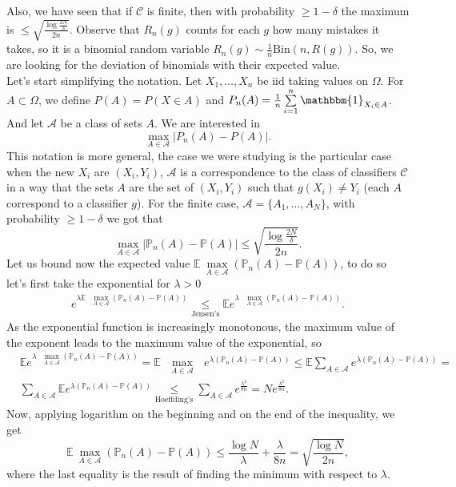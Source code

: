 \documentclass[11pt, english]{article}
\begin{document}
Also, we have seen that if $\mathcal{C}$ is finite, then with probability $\geq 1-\delta$ the maximum is $\leq \sqrt{\frac{\log\frac{2N}{\delta}}{2n}}$. Observe that $R_n(g)$ counts for each $g$ how many mistakes it takes, so it is a binomial random variable $R_n(g)\sim \frac{1}{n}\text{Bin}(n,R(g))$. So, we are looking for the deviation of binomials with their expected value.\\ 

Let's start simplifying the notation. Let $X_1,\dots,X_n$ be iid taking values on $\Omega$. For $A\subset \Omega$, we define $P(A)=P(X\in A)$ and $P_n(A)=\frac{1}{n}\sum\limits_{i=1}^n\mathbbm{1}_{X_i\in A}$. And let $\mathcal{A}$ be a class of sets $A$. We are interested in 
\begin{equation}
	\underset{A\in\mathcal{A}}{\max}|P_n(A)-P(A)|.
\end{equation}
This notation is more general, the case we were studying is the particular case when the new $X_i$ are $(X_i,Y_i)$, $\mathcal{A}$ is a correspondence to the class of classifiers $\mathcal{C}$ in a way that the sets $A$ are the set of $(X_i,Y_i)$ such that $g(X_i)\neq Y_i$ (each $A$ correspond to a classifier $g$). For the finite case, $\mathcal{A}=\{A_1,\dots,A_N\}$, with probability $\geq 1-\delta$ we got that  
\begin{equation}
	\underset{A\in\mathcal{A}}{\max}|\mathbb{P}_n(A)-\mathbb{P}(A)|\leq\sqrt{\frac{\log\frac{2N}{\delta}}{2n}}.
\end{equation}
Let us bound now the expected value $\mathbb{E}\ \underset{A\in\mathcal{A}}{\max}(\mathbb{P}_n(A)-\mathbb{P}(A))$, to do so let's first take the exponential for $\lambda>0$
\begin{align}
	e^{\lambda\mathbb{E}\text{ }\underset{A\in\mathcal{A}}{\max}(\mathbb{P}_n(A)-\mathbb{P}(A))}\underset{\text{Jensen's}}{\leq}\mathbb{E}e^{\lambda\text{ }\underset{A\in\mathcal{A}}{\max}(\mathbb{P}_n(A)-\mathbb{P}(A))}.
\end{align}
As the exponential function is increasingly monotonous, the maximum value of the exponent leads to the maximum value of the exponential, so 
\begin{align}
	&\mathbb{E}e^{\lambda\text{ }\underset{A\in\mathcal{A}}{\max}(\mathbb{P}_n(A)-\mathbb{P}(A))}=\mathbb{E}\text{ }\underset{A\in\mathcal{A}}{\max}\text{ }e^{\lambda(\mathbb{P}_n(A)-\mathbb{P}(A))}\leq\mathbb{E}\sum\limits_{A\in\mathcal{A}}e^{\lambda(\mathbb{P}_n(A)-\mathbb{P}(A))}=\\
	&\sum\limits_{A\in\mathcal{A}}\mathbb{E}e^{\lambda(\mathbb{P}_n(A)-\mathbb{P}(A))}\underset{\text{Hoeffding's}}{\leq}\sum\limits_{A\in\mathcal{A}}e^{\frac{\lambda^2}{8n}}=Ne^{\frac{\lambda^2}{8n}}.
\end{align}
Now, applying logarithm on the beginning and on the end of the inequality, we get
\begin{equation}
	\mathbb{E}\ \underset{A\in\mathcal{A}}{\max}(\mathbb{P}_n(A)-\mathbb{P}(A))\leq\frac{\log N}{\lambda}+\frac{\lambda}{8n}=\sqrt{\frac{\log N}{2n}}, 
\end{equation}
where the last equality is the result of finding the minimum with respect to $\lambda$.\\
\end{document}
